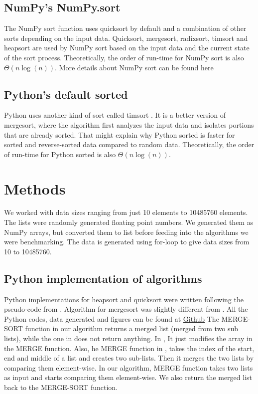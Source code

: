 \documentclass[sigconf, nonacm, natbib, screen, balance=False]{acmart}
\begin{document}
\subsection{NumPy's NumPy.sort}\label{sec:NumPy sort}
The NumPy sort function uses quicksort by default and a combination of other sorts depending on the input data. Quicksort, mergesort, radixsort, timsort and heapsort are used by NumPy sort based on the input data and the current state of the sort process.\newline
Theoretically, the order of run-time for NumPy sort is also $\Theta \left(n\log\left(n\right)\right)$. More details about NumPy sort can be found here \citet{NumPySortDocumentation} 

\subsection{Python's default sorted}\label{sec:sorted sort}
Python uses another kind of sort called timsort \citet{TimPetersArticle}. It is a better version of mergesort, where the algorithm first analyzes the input data and isolates portions that are already sorted. That might explain why Python sorted is faster for sorted and reverse-sorted data compared to random data.\newline
Theoretically, the order of run-time for Python sorted  is also $\Theta \left(n\log\left(n\right)\right)$.

\section{Methods}\label{sec:methods}
We worked with data sizes ranging from just 10 elements to 10485760 elements. The lists were randomly generated floating point numbers. We generated them as NumPy arrays, but converted them to list before feeding into the algorithms we were benchmarking. The data is generated using for-loop to give data sizes from 10 to 10485760. 

\subsection{Python implementation of algorithms}\label{sec:Python implementation}

Python implementations for heapsort and quicksort were written following the pseudo-code from \citet{CLRS_2009}. Algorithm for mergesort was slightly different from \citet{CLRS_2009}. All the Python codes, data generated and figures can be found at \href{https://github.com/vsnupoudel/termpaper01.}{Github} \newline
The MERGE-SORT function in our algorithm returns a merged list (merged from two sub lists), while the one in \citet{CLRS_2009} does not return anything. In \citet{CLRS_2009}, It just modifies the array in the MERGE function.
Also, he MERGE function in \citet{CLRS_2009}, takes the index of the start, end and middle of a list and creates two sub-lists. Then it merges the two lists by comparing them element-wise. In our algorithm, MERGE function takes two lists as input and starts comparing them element-wise. We also return the merged list back to the MERGE-SORT function.
\end{document}

